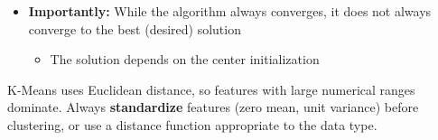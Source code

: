 \documentclass[11pt,a4paper,openany]{book}
\begin{document}
\begin{algbox}[title=K-Means Algorithm]
\begin{itemize}
\begin{itemize}
        \item The difference in assignments or center locations between two iterations can
        be used as criteria to stop the algorithm
    \end{itemize}
    
    \item \textbf{Importantly:} While the algorithm always converges, it does
    not always converge to the best (desired) solution
    
    \begin{itemize}
        \item The solution depends on the center initialization
    \end{itemize}
\end{itemize}
\end{algbox}

\begin{warnbox}[title=Importance of Feature Scaling]
K-Means uses Euclidean distance, so features with large numerical ranges dominate.
Always \textbf{standardize} features (zero mean, unit variance) before clustering,
or use a distance function appropriate to the data type.
\end{warnbox}

\end{document}
